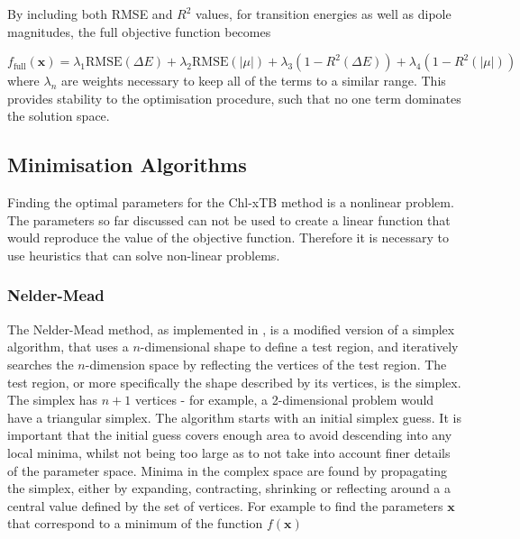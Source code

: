 By including both RMSE and $R^2$ values, for transition energies as well as dipole
magnitudes, the full objective function becomes

\begin{equation}
f_{\text{full}} \left( \mathbf{x} \right) = \lambda_1 \text{RMSE} \left(\Delta E \right)+ \lambda_2 \text{RMSE}\left( \left| \mu \right| \right) + \lambda_3 \left(1 - R^2 \left( \Delta E \right)\right) + \lambda_4 \left( 1 - R^2 \left( \left| \mu \right| \right)\right)
    \label{eq:obj_func}
\end{equation}
%
where $\lambda_n$ are weights necessary to keep all of the terms to a similar range.
This provides stability to the optimisation procedure, such that no one term dominates
the solution space.

\subsection{Minimisation Algorithms}
\label{subsec:algorithms}
Finding the optimal parameters for the Chl-xTB method is a nonlinear problem. The
parameters so far discussed can not be used to create a linear function that would
reproduce the value of the objective function. Therefore it is necessary to use 
heuristics that can solve non-linear problems.

\subsubsection{Nelder-Mead}
\label{nelder_mead}
The Nelder-Mead method, as implemented in , is a modified version of a simplex
algorithm, that uses a $n$-dimensional shape to define a test region, and iteratively
searches the $n$-dimension space by reflecting the vertices of the test region. 
The test region, or more specifically the shape described by its vertices, is the
simplex. The simplex has $n+1$ vertices - for example, a 2-dimensional problem
would have a triangular simplex.
The algorithm starts with an initial simplex guess. It is important that the initial
guess covers enough area to avoid descending into any local minima, whilst not being
too large as to not take into account finer details of the parameter space. Minima
in the complex space are found by propagating the simplex, either by expanding,
contracting, shrinking or reflecting around a a central value defined by the set
of vertices. For example to find the parameters $\mathbf{x}$ that correspond to 
a minimum of the function $f\left(\mathbf{x}\right)$

